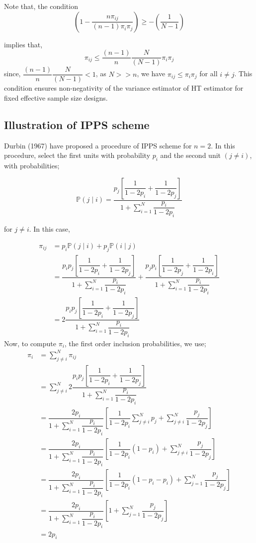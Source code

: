 \documentclass[12pt]{article}
\newcommand{\prob}{\mathbb{P}}
\theoremstyle{definition}
\newenvironment{note}{
\begin{tcolorbox}[colback=blue!5!white,colframe=blue!75!black,title=Note, parbox = false] }{\end{tcolorbox} }
\begin{document}
\begin{note}
    Note that, the condition 
    $$\left( 1 - \dfrac{n \pi_{ij}}{(n-1)\pi_i \pi_j} \right) \geq -\left(\dfrac{1}{N-1}\right) $$ 
    
    implies that, 
    $$\pi_{ij} \leq \dfrac{(n-1)}{n} \dfrac{N}{(N-1)} \pi_i \pi_j $$
    since, $\dfrac{(n-1)}{n} \dfrac{N}{(N-1)} < 1$, as $N >> n$, we have $\pi_{ij} \leq \pi_i \pi_j$ for all $i \neq j$. This condition ensures non-negativity of the variance estimator of HT estimator for fixed effective sample size designs.        
\end{note}


\subsection{Illustration of IPPS scheme}

Durbin (1967) have proposed a procedure of IPPS scheme for $n = 2$. In this procedure, select the first units with probability $p_i$ and the second unit $(j \neq i)$, with probabilities;

$$\prob(j \mid i) = \dfrac{p_j \left[ \dfrac{1}{1-2p_i} + \dfrac{1}{1-2p_j} \right]}{1 + \sum_{i=1}^N \dfrac{p_i}{1 - 2p_i}}$$

for $j \neq i$. In this case, 

\begin{align*}
    \pi_{ij} & = p_i \prob(j \mid i) + p_j \prob(i \mid j)\\
    & = \dfrac{p_ip_j \left[ \dfrac{1}{1-2p_i} + \dfrac{1}{1-2p_j} \right]}{1 + \sum_{i=1}^N \dfrac{p_i}{1 - 2p_i}} +
    \dfrac{p_j p_i \left[ \dfrac{1}{1-2p_j} + \dfrac{1}{1-2p_i} \right]}{1 + \sum_{i=1}^N \dfrac{p_i}{1 - 2p_i}}\\
    & = 2\dfrac{p_i p_j \left[ \dfrac{1}{1-2p_i} + \dfrac{1}{1-2p_j} \right]}{1 + \sum_{i=1}^N \dfrac{p_i}{1 - 2p_i}}
\end{align*}
Now, to compute $\pi_i$, the first order inclusion probabilities, we use;
\begin{align*}
    \pi_i & = \sum_{j \neq i}^N \pi_{ij}\\
    & = \sum_{j \neq i}^N 2\dfrac{p_i p_j \left[ \dfrac{1}{1-2p_i} + \dfrac{1}{1-2p_j} \right]}{1 + \sum_{i=1}^N \dfrac{p_i}{1 - 2p_i}}\\
    & = \dfrac{2 p_i}{1 + \sum_{i=1}^N \dfrac{p_i}{1 - 2p_i}} \left[
        \dfrac{1}{1-2p_i} \sum_{j \neq i}^N p_j + \sum_{j\neq i}^N \dfrac{p_j}{1-2p_j} \right]\\
    & = \dfrac{2 p_i}{1 + \sum_{i=1}^N \dfrac{p_i}{1 - 2p_i}} \left[  \dfrac{1}{1-2p_i} (1-p_i) + \sum_{j\neq i}^N \dfrac{p_j}{1-2p_j}\right]\\
    & = \dfrac{2 p_i}{1 + \sum_{i=1}^N \dfrac{p_i}{1 - 2p_i}} \left[  \dfrac{1}{1-2p_i} (1 - p_i - p_i) + \sum_{j = 1}^N \dfrac{p_j}{1-2p_j} \right]\\
    & = \dfrac{2 p_i}{1 + \sum_{i=1}^N \dfrac{p_i}{1 - 2p_i}} \left[ 1 + \sum_{j = 1}^N \dfrac{p_j}{1-2p_j} \right]\\
    & = 2p_i
\end{align*}
\end{document}
